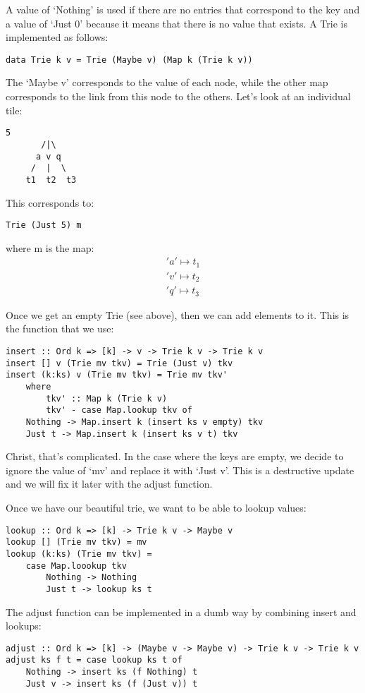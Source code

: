 \documentclass[11pt,a4paper,titlepage,dvipsnames,cmyk]{scrartcl}
\begin{document}
A value of `Nothing' is used if there are no entries that correspond to
the key and a value of `Just 0' because it means that there is no value
that exists. A Trie is implemented as follows:
\begin{lstlisting}[style=B]
data Trie k v = Trie (Maybe v) (Map k (Trie k v))
\end{lstlisting}

The `Maybe v' corresponds to the value of each node, while the other map
corresponds to the link from this node to the others. Let's look at an
individual tile:
\begin{lstlisting}[style=B]
        5
       /|\
      a v q
     /  |  \
    t1  t2  t3
\end{lstlisting}
This corresponds to:
\begin{lstlisting}[style=B]
Trie (Just 5) m
\end{lstlisting}
where m is the map:
\begin{gather*}
    'a' \mapsto t_1 \\
    'v' \mapsto t_2 \\
    'q' \mapsto t_3
\end{gather*}

Once we get an empty Trie (see above), then we can add elements to it.
This is the function that we use:
\begin{lstlisting}[style=B]
insert :: Ord k => [k] -> v -> Trie k v -> Trie k v
insert [] v (Trie mv tkv) = Trie (Just v) tkv
insert (k:ks) v (Trie mv tkv) = Trie mv tkv'
    where
        tkv' :: Map k (Trie k v)
        tkv' - case Map.lookup tkv of
    Nothing -> Map.insert k (insert ks v empty) tkv
    Just t -> Map.insert k (insert ks v t) tkv
\end{lstlisting}

Christ, that's complicated. In the case where the keys are empty, we
decide to ignore the value of `mv' and replace it with `Just v'. This is a
destructive update and we will fix it later with the adjust function.

Once we have our beautiful trie, we want to be able to lookup values:
\begin{lstlisting}[style=B]
lookup :: Ord k => [k] -> Trie k v -> Maybe v
lookup [] (Trie mv tkv) = mv
lookup (k:ks) (Trie mv tkv) =
    case Map.loookup tkv
        Nothing -> Nothing
        Just t -> lookup ks t
\end{lstlisting}


The adjust function can be implemented in a dumb way by combining insert
and lookups:
\begin{lstlisting}[style=B]
adjust :: Ord k => [k] -> (Maybe v -> Maybe v) -> Trie k v -> Trie k v
adjust ks f t = case lookup ks t of
    Nothing -> insert ks (f Nothing) t
    Just v -> insert ks (f (Just v)) t
\end{lstlisting}
\end{document}
